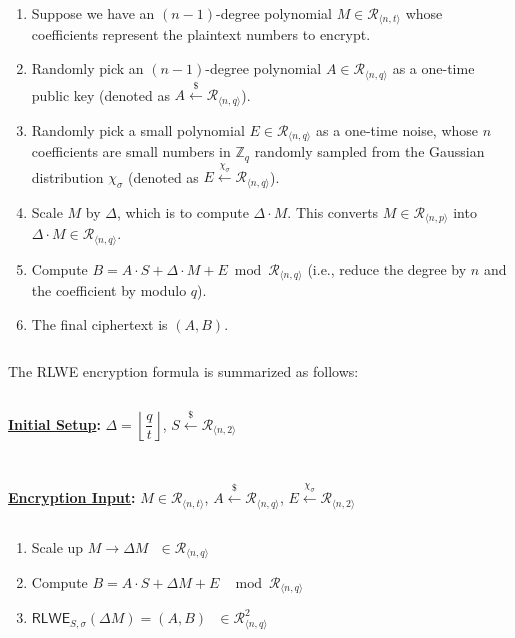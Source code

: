 \begin{enumerate}
\item Suppose we have an $(n-1)$-degree polynomial $M \in \mathcal{R}_{\langle n, t \rangle}$ whose coefficients represent the plaintext numbers to encrypt. 
\item Randomly pick an $(n-1)$-degree polynomial $A \in \mathcal{R}_{\langle n,q \rangle}$ as a one-time public key (denoted as $A \xleftarrow{\$} \mathcal{R}_{\langle n, q \rangle}$). 
\item Randomly pick a small polynomial $E \in \mathcal{R}_{\langle n,q \rangle}$ as a one-time noise, whose $n$ coefficients are small numbers in $\mathbb{Z}_q$ randomly sampled from the Gaussian distribution $\chi_\sigma$ (denoted as $E \xleftarrow{\chi_\sigma} \mathcal{R}_{\langle n, q \rangle}$). 
\item Scale $M$ by $\Delta$, which is to compute $\Delta \cdot M$. This converts $M \in \mathcal{R}_{\langle n,p \rangle}$ into $\Delta \cdot M \in \mathcal{R}_{\langle n,q \rangle}$.
\item Compute $B = A \cdot S + \Delta \cdot M + E \bmod \mathcal{R}_{\langle n,q \rangle}$ (i.e., reduce the degree by $n$ and the coefficient by modulo $q$). 
\item The final ciphertext is $(A, B)$.
\end{enumerate}

$ $

The RLWE encryption formula is summarized as follows:

$ $
\begin{tcolorbox}[title={\textbf{\tboxlabel{\ref*{subsec:rlwe-enc}} RLWE Encryption}}]
\textbf{\underline{Initial Setup}:} $\Delta = \left\lfloor\dfrac{q}{t}\right\rfloor$, $S \xleftarrow{\$} \mathcal{R}_{\langle n, 2 \rangle}$

$ $

$ $

\textbf{\underline{Encryption Input}:} $M \in \mathcal{R}_{\langle n, t \rangle}$, $A \xleftarrow{\$} \mathcal{R}_{\langle n, q \rangle}$, $E \xleftarrow{\chi_\sigma} \mathcal{R}_{\langle n, 2 \rangle}$

$ $

\begin{enumerate}
\item Scale up $M \longrightarrow \Delta  M \text{ } \in \mathcal{R}_{\langle n, q \rangle}$
\item Compute $B = A \cdot S + \Delta  M + E  \text{ } \bmod \mathcal{R}_{\langle n,q \rangle}$
\item $\textsf{RLWE}_{S,\sigma}(\Delta  M) = (A, B) \text{ } \in \mathcal{R}_{\langle n,q \rangle}^2$
\end{enumerate}

\end{tcolorbox}

